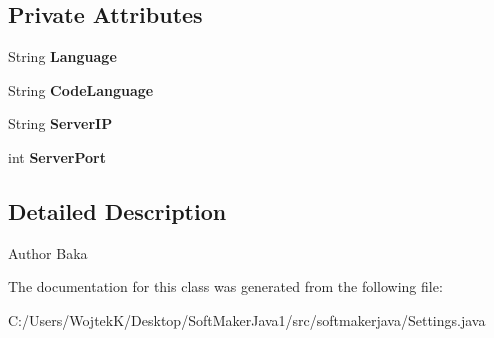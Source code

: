 \subsection*{Private Attributes}
\begin{DoxyCompactItemize}
\item 
String {\bfseries Language}\hypertarget{classsoftmakerjava_1_1_settings_a1d426ec86b5b7c0ef4dffdb4f2a5583d}{}\label{classsoftmakerjava_1_1_settings_a1d426ec86b5b7c0ef4dffdb4f2a5583d}

\item 
String {\bfseries Code\+Language}\hypertarget{classsoftmakerjava_1_1_settings_a2f84d3c56224d3e38da239a2461ee6da}{}\label{classsoftmakerjava_1_1_settings_a2f84d3c56224d3e38da239a2461ee6da}

\item 
String {\bfseries Server\+IP}\hypertarget{classsoftmakerjava_1_1_settings_a4ae12ca7cfc3eaccec1fe0b005de71a2}{}\label{classsoftmakerjava_1_1_settings_a4ae12ca7cfc3eaccec1fe0b005de71a2}

\item 
int {\bfseries Server\+Port}\hypertarget{classsoftmakerjava_1_1_settings_a4730f3da93d2d4f792fff7bac3f2a6fc}{}\label{classsoftmakerjava_1_1_settings_a4730f3da93d2d4f792fff7bac3f2a6fc}

\end{DoxyCompactItemize}


\subsection{Detailed Description}
\begin{DoxyAuthor}{Author}
Baka 
\end{DoxyAuthor}


The documentation for this class was generated from the following file\+:\begin{DoxyCompactItemize}
\item 
C\+:/\+Users/\+Wojtek\+K/\+Desktop/\+Soft\+Maker\+Java1/src/softmakerjava/Settings.\+java\end{DoxyCompactItemize}
